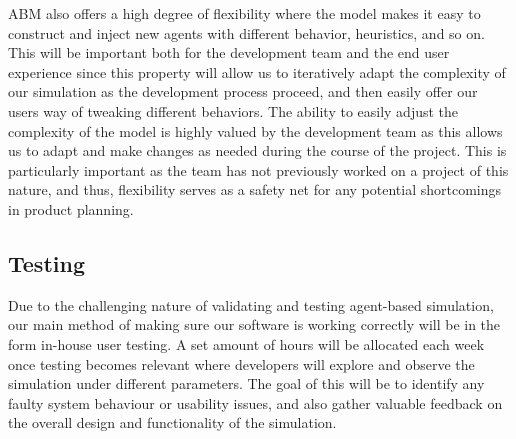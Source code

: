 ABM also offers a high degree of flexibility where the model makes it easy to construct and inject new agents with different behavior, heuristics, and so on. This will be important both for the development team and the end user experience since this property will allow us to iteratively adapt the complexity of our simulation as the development process proceed, and then easily offer our users way of tweaking different behaviors. The ability to easily adjust the complexity of the model is highly valued by the development team as this allows us to adapt and make changes as needed during the course of the project. This is particularly important as the team has not previously worked on a project of this nature, and thus, flexibility serves as a safety net for any potential shortcomings in product planning. 

\subsection{Testing}
Due to the challenging nature of validating and testing agent-based simulation, our main method of making sure our software is working correctly will be in the form in-house user testing. A set amount of hours will be allocated each week once testing becomes relevant where developers will explore and observe the simulation under different parameters. The goal of this will be to identify any faulty system behaviour or usability issues, and also gather valuable feedback on the overall design and functionality of the simulation. 
